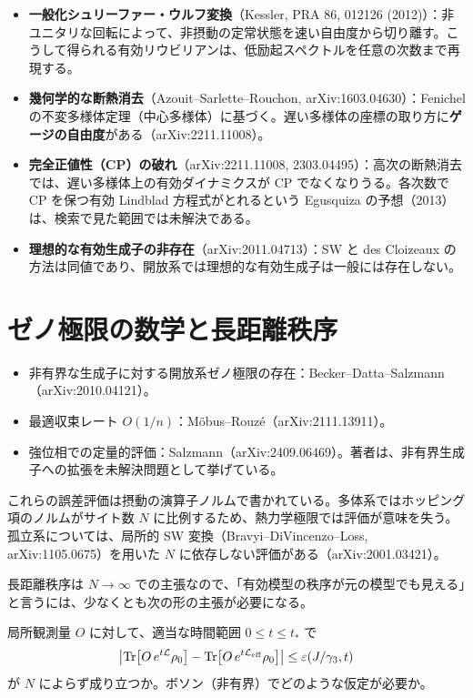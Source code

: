 \documentclass[11pt]{ltjsarticle}
\begin{document}
\begin{itemize}
\item \textbf{一般化シュリーファー・ウルフ変換}（Kessler, PRA 86, 012126 (2012)）：非ユニタリな回転によって、非摂動の定常状態を速い自由度から切り離す。こうして得られる有効リウビリアンは、低励起スペクトルを任意の次数まで再現する。
\item \textbf{幾何学的な断熱消去}（Azouit--Sarlette--Rouchon, arXiv:1603.04630）：Fenichel の不変多様体定理（中心多様体）に基づく。遅い多様体の座標の取り方に\textbf{ゲージの自由度}がある（arXiv:2211.11008）。
\item \textbf{完全正値性（CP）の破れ}（arXiv:2211.11008, 2303.04495）：高次の断熱消去では、遅い多様体上の有効ダイナミクスが CP でなくなりうる。各次数で CP を保つ有効 Lindblad 方程式がとれるという Egusquiza の予想（2013）は、検索で見た範囲では未解決である。
\item \textbf{理想的な有効生成子の非存在}（arXiv:2011.04713）：SW と des Cloizeaux の方法は同値であり、開放系では理想的な有効生成子は一般には存在しない。
\end{itemize}

\section{ゼノ極限の数学と長距離秩序}

\begin{itemize}
\item 非有界な生成子に対する開放系ゼノ極限の存在：Becker--Datta--Salzmann（arXiv:2010.04121）。
\item 最適収束レート $O(1/n)$：Möbus--Rouzé（arXiv:2111.13911）。
\item 強位相での定量的評価：Salzmann（arXiv:2409.06469）。著者は、非有界生成子への拡張を未解決問題として挙げている。
\end{itemize}

これらの誤差評価は摂動の演算子ノルムで書かれている。多体系ではホッピング項のノルムがサイト数 $N$ に比例するため、熱力学極限では評価が意味を失う。孤立系については、局所的 SW 変換（Bravyi--DiVincenzo--Loss, arXiv:1105.0675）を用いた $N$ に依存しない評価がある（arXiv:2001.03421）。

長距離秩序は $N\to\infty$ での主張なので、「有効模型の秩序が元の模型でも見える」と言うには、少なくとも次の形の主張が必要になる。
\begin{question}
局所観測量 $O$ に対して、適当な時間範囲 $0\le t\le t_*$ で
\begin{equation}
\abs{\Tr[O\,e^{t\mathcal{L}}\rho_0] - \Tr[O\,e^{t\mathcal{L}_{\mathrm{eff}}}\rho_0]} \le \varepsilon(J/\gamma_3,t)
\end{equation}
が $N$ によらず成り立つか。ボソン（非有界）でどのような仮定が必要か。
\end{question}
\end{document}
